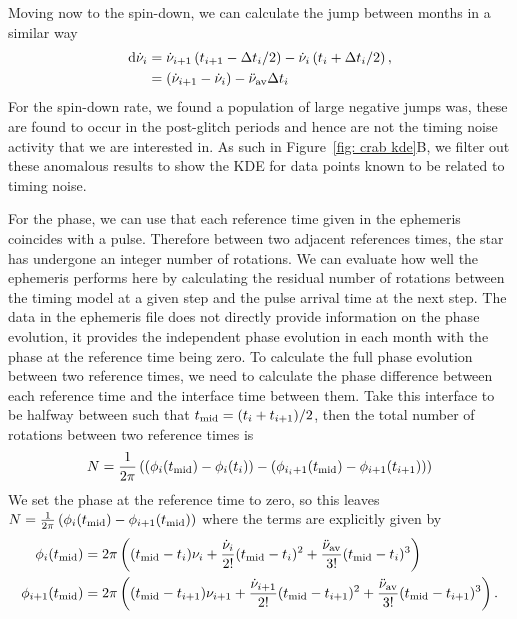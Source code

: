 \documentclass[../full_thesis/full_thesis.tex]{subfiles}
\begin{document}
{Moving now to the spin-down, we can calculate the jump between months in a similar way
\begin{align}
\mathrm{d}\dot{\nu}_{i} & = \dot{\nu}_{i+1}\left(t_{i+1}-\Delta t_{i}/2\right) -  \dot{\nu}_{i}\left(t_{i}+\Delta t_{i}/2\right), \\
& = \left(\dot{\nu}_{i+1}-\dot{\nu}_{i}\right) -  \ddot{\nu}_{\textrm{av}} \Delta t_{i}
\label{eqn: crab spindown residuals}
\end{align}
For the spin-down rate, we found a population of large negative jumps was, these are
found to occur in the post-glitch periods and hence are not the timing noise
activity that we are interested in. As such in Figure~\ref{fig: crab kde}B, we
filter out these anomalous results to show the KDE for data points known to be
related to timing noise.

For the phase, we can use that each reference time given in the ephemeris
coincides with a pulse. Therefore between two adjacent references times, the
star has undergone an integer number of rotations. We can evaluate how well the
ephemeris performs here by calculating the residual number of rotations between
the timing model at a given step and the pulse arrival time at the next step.
The data in the ephemeris file does not directly provide information on the
phase evolution, it provides the independent phase evolution in each month with
the phase at the reference time being zero. To calculate the full phase
evolution between two reference times, we need to calculate the phase
difference between each reference time and the interface time between them.
Take this interface to be halfway between such that $t_{\textrm{mid}}=(t_{i} +
t_{i+1})/2$, then the total number of rotations between two reference times is
\begin{equation}
    N = \frac{1}{2\pi}\left(\left(\phi_{i}(t_{\textrm{mid}}) - \phi_{i}(t_{i})\right) -
    \left(\phi_{i_i+1}(t_{\textrm{mid}}) - \phi_{i+1}(t_{i+1})\right)\right)
\end{equation}
We set the phase at the reference time to zero, so this leaves $N =
\frac{1}{2\pi}\left(\phi_{i}(t_{\textrm{mid}}) - \phi_{i+1}(t_{\textrm{mid}})\right)$ where the terms
are explicitly given by
\begin{align}
\phi_{i}(t_{\textrm{mid}}) & = 2\pi\left((t_{\textrm{mid}} - t_{i})\nu_{i} +  \frac{\dot{\nu}_{i}}{2!}(t_{\textrm{mid}} - t_{i})^{2}+\frac{\ddot{\nu}_{\textrm{av}}}{3!}(t_{\textrm{mid}} - t_{i})^{3}\right) \\
\phi_{i+1}(t_{\textrm{mid}}) & = 2\pi\left((t_{\textrm{mid}} - t_{i+1})\nu_{i+1} +  \frac{\dot{\nu}_{i+1}}{2!}(t_{\textrm{mid}} - t_{i+1})^{2}+\frac{\ddot{\nu}_{\textrm{av}}}{3!}(t_{\textrm{mid}} - t_{i+1})^{3}\right) .
\end{align}

}
\end{document}
